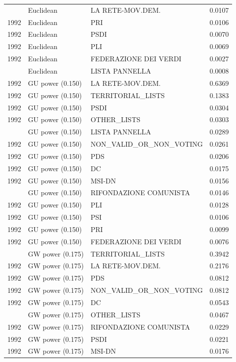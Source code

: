 \begin{longtable}[t]{rllr}
\addlinespace
1992 & Euclidean & LA RETE-MOV.DEM. & 0.0107\\
1992 & Euclidean & PRI & 0.0106\\
1992 & Euclidean & PSDI & 0.0070\\
1992 & Euclidean & PLI & 0.0069\\
1992 & Euclidean & FEDERAZIONE DEI VERDI & 0.0027\\
\addlinespace
1992 & Euclidean & LISTA PANNELLA & 0.0008\\
1992 & GU power (0.150) & LA RETE-MOV.DEM. & 0.6369\\
1992 & GU power (0.150) & TERRITORIAL\_LISTS & 0.1383\\
1992 & GU power (0.150) & PSDI & 0.0304\\
1992 & GU power (0.150) & OTHER\_LISTS & 0.0303\\
\addlinespace
1992 & GU power (0.150) & LISTA PANNELLA & 0.0289\\
1992 & GU power (0.150) & NON\_VALID\_OR\_NON\_VOTING & 0.0261\\
1992 & GU power (0.150) & PDS & 0.0206\\
1992 & GU power (0.150) & DC & 0.0175\\
1992 & GU power (0.150) & MSI-DN & 0.0156\\
\addlinespace
1992 & GU power (0.150) & RIFONDAZIONE COMUNISTA & 0.0146\\
1992 & GU power (0.150) & PLI & 0.0128\\
1992 & GU power (0.150) & PSI & 0.0106\\
1992 & GU power (0.150) & PRI & 0.0099\\
1992 & GU power (0.150) & FEDERAZIONE DEI VERDI & 0.0076\\
\addlinespace
1992 & GW power (0.175) & TERRITORIAL\_LISTS & 0.3942\\
1992 & GW power (0.175) & LA RETE-MOV.DEM. & 0.2176\\
1992 & GW power (0.175) & PDS & 0.0812\\
1992 & GW power (0.175) & NON\_VALID\_OR\_NON\_VOTING & 0.0812\\
1992 & GW power (0.175) & DC & 0.0543\\
\addlinespace
1992 & GW power (0.175) & OTHER\_LISTS & 0.0467\\
1992 & GW power (0.175) & RIFONDAZIONE COMUNISTA & 0.0229\\
1992 & GW power (0.175) & PSDI & 0.0221\\
1992 & GW power (0.175) & MSI-DN & 0.0176\\

\end{longtable}
